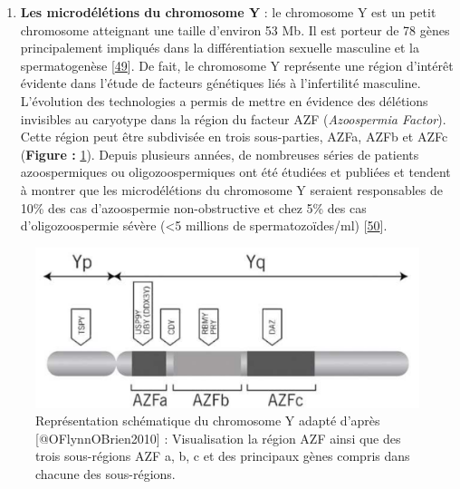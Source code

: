 \documentclass[12pt,twoside]{ugathesis}
\providecommand{\tightlist}{%
  \setlength{\itemsep}{0pt}\setlength{\parskip}{0pt}}
\theoremstyle{definition}
\theoremstyle{definition}
\theoremstyle{remark}
\begin{document}
\begin{enumerate}
\def\labelenumi{\arabic{enumi}.}
\tightlist
\item
  \textbf{Les microdélétions du chromosome Y} : le chromosome Y est un
  petit chromosome atteignant une taille d'environ 53 Mb. Il est porteur
  de 78 gènes principalement impliqués dans la différentiation sexuelle
  masculine et la spermatogenèse
  {[}\protect\hyperlink{ref-Skaletsky2003}{49}{]}. De fait, le
  chromosome Y représente une région d'intérêt évidente dans l'étude de
  facteurs génétiques liés à l'infertilité masculine. L'évolution des
  technologies a permis de mettre en évidence des délétions invisibles
  au caryotype dans la région du facteur AZF (\emph{Azoospermia
  Factor}). Cette région peut être subdivisée en trois sous-parties,
  AZFa, AZFb et AZFc (\textbf{Figure :} \ref{fig:chry}). Depuis
  plusieurs années, de nombreuses séries de patients azoospermiques ou
  oligozoospermiques ont été étudiées et publiées et tendent à montrer
  que les microdélétions du chromosome Y seraient responsables de 10\%
  des cas d'azoospermie non-obstructive et chez 5\% des cas
  d'oligozoospermie sévère (\textless{}5 millions de spermatozoïdes/ml)
  {[}\protect\hyperlink{ref-Hotaling2014}{50}{]}.
\end{enumerate}

\newpage

\begin{figure}

{\centering \includegraphics[scale=.45]{figure/chromozomeY} 

}

\caption[Représentation schématique du chromosome Y adapté]{Représentation schématique du chromosome Y adapté d'après [@OFlynnOBrien2010] : Visualisation la région AZF ainsi que des trois sous-régions AZF a, b, c et des principaux gènes compris dans chacune des sous-régions.}\label{fig:chry}
\end{figure}
\end{document}
